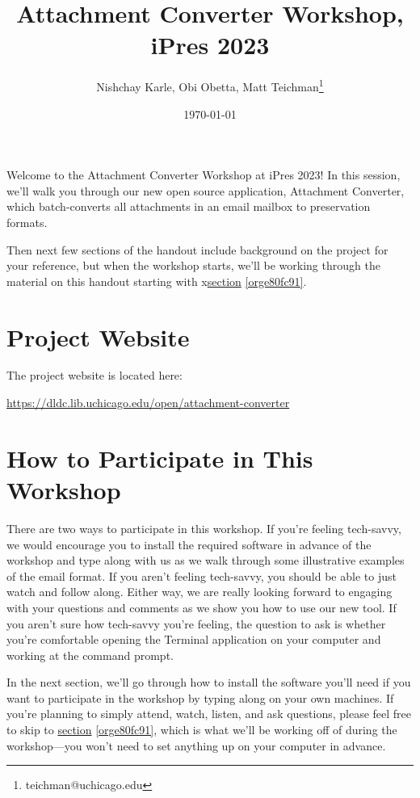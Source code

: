 \documentclass[11pt]{article}
\author{Nishchay Karle, Obi Obetta, Matt Teichman\thanks{teichman@uchicago.edu}}
\date{\today}
\title{Attachment Converter Workshop, iPres 2023}
\begin{document}
\maketitle
Welcome to the Attachment Converter Workshop at iPres 2023!  In this
session, we'll walk you through our new open source application,
Attachment Converter, which batch-converts all attachments in an email
mailbox to preservation formats.

Then next few sections of the handout include background on the
project for your reference, but when the workshop starts, we'll be
working through the material on this handout starting with x\hyperref[orge80fc91]{section}
\ref{orge80fc91}.

\section{Project Website}
\label{sec:org379917b}

The project website is located here:

\url{https://dldc.lib.uchicago.edu/open/attachment-converter}


\section{How to Participate in This Workshop}
\label{sec:orge1231ab}

There are two ways to participate in this workshop.  If you're feeling
tech-savvy, we would encourage you to install the required software in
advance of the workshop and type along with us as we walk through some
illustrative examples of the email format.  If you aren't feeling
tech-savvy, you should be able to just watch and follow along.  Either
way, we are really looking forward to engaging with your questions and
comments as we show you how to use our new tool. If you aren't sure
how tech-savvy you're feeling, the question to ask is whether you're
comfortable opening the Terminal application on your computer and
working at the command prompt.

In the next section, we'll go through how to install the software
you'll need if you want to participate in the workshop by typing along
on your own machines.  If you're planning to simply attend, watch,
listen, and ask questions, please feel free to skip to \hyperref[orge80fc91]{section}
\ref{orge80fc91}, which is what we'll be working off of during the
workshop---you won't need to set anything up on your computer in
advance.
\end{document}
